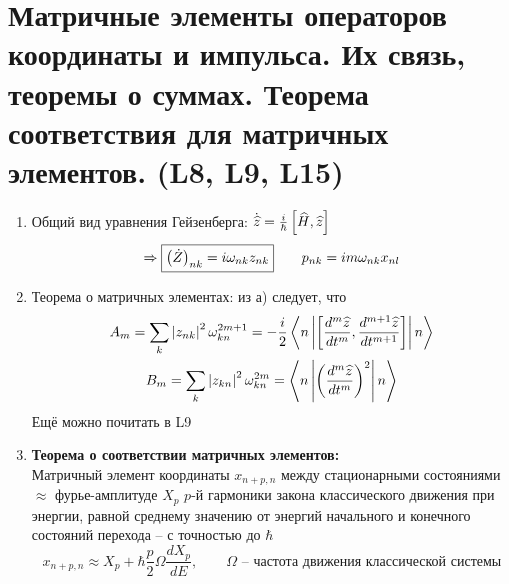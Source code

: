 \documentclass[12pt]{customArticle}
\begin{document}
	\section{Матричные элементы операторов координаты и импульса. Их связь, теоремы о суммах. Теорема соответствия для матричных элементов. (L8, L9, L15)}
	
		\begin{enumerate}[label=\asbuk*)]
			\item{
				Общий вид уравнения Гейзенберга: $\dot{\widehat z} = \frac{i}{\hbar} \left[ \widehat H, \widehat z \right]$
				\[
					\Rightarrow \boxed{ \left( \dot Z \right)_{nk} = i \omega_{nk} z_{nk} }
					\qquad
					p_{nk} = i m \omega_{nk} x_{nl}
				\]
			}
			\item{
				Теорема о матричных элементах: из а) следует, что
				\begin{gather*}
					A_m = \sum_k \left| z_{nk} \right|^2 \omega^{2m+1}_{kn} = -\frac{i}{2} \Braket{n \left|  \left[ \frac{d^m \widehat z}{d t^m}, \frac{d^{m+1} \widehat z}{d t^{m+1}} \right]  \right| n}
					\\
					B_m = \sum_k \left| z_{kn} \right|^2 \omega^{2m}_{kn} = \Braket{n  \left|  \left( \frac{d^m \widehat z}{d t^m} \right)^2  \right| n}
				\end{gather*}
				Ещё можно почитать в L9
			}
			\item{
				\textbf{Теорема о соответствии матричных элементов:}
				\\
				Матричный элемент координаты $x_{n+p, n}$ между стационарными состояниями $\approx$ фурье-амплитуде $X_p$ $p$-й гармоники закона классического движения при энергии, равной среднему значению от энергий начального и конечного состояний перехода -- с точностью до $\hbar$
				\[
					x_{n+p, n} \approx X_p + \hbar \frac{p}{2} \Omega \frac{d X_p}{dE}, \qquad \Omega \text{ -- частота движения классической системы}
				\]
			}
		\end{enumerate}
	
				
		
		
		
		
		
		
		
		
		
		
		
		
		
		
		
		
		
		
		
		
		
		
		
		
		
		
		
		
		
		
		
		
		
		
		
		
		
		
		
\end{document}
